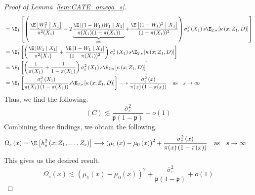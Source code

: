 \begin{proof}[Proof of Lemma~\ref{lem:CATE_omega_s}]
\begin{equation}
\begin{aligned}
            & = \E_{1}\left[\left(\frac{\E\left[W_{1}^2 \; \middle| \; X_1\right]}{\pi^2(X_1)} 
            - 2 \underbrace{\frac{\E\left[(1 - W_{1})W_{1}\; \middle| \; X_1\right]}{\pi(X_1)(1 - \pi(X_1))}}_{ = 0} 
            + \frac{\E\left[(1 - W_{1})^2\; \middle| \; X_1\right]}{(1 - \pi(X_1))^2}\right)
             \sigma_{\varepsilon}^2\left(X_1\right) s \E_{2:s}\left[\kappa\left(x; Z_1, D\right)\right]\right] \\ 
            & = \E_{1}\left[\left(\frac{\E\left[W_{1} \; \middle| \; X_1\right]}{\pi^2(X_1)} 
            + \frac{\E\left[1 - W_{1}\; \middle| \; X_1\right]}{(1 - \pi(X_1))^2}\right)
             \sigma_{\varepsilon}^2\left(X_1\right) s \E_{2:s}\left[\kappa\left(x; Z_1, D\right)\right]\right] \\
            & = \E_{1}\left[\left(\frac{1}{\pi(X_1)} + \frac{1}{1 - \pi(X_1)}\right)
             \sigma_{\varepsilon}^2\left(X_1\right) s \E_{2:s}\left[\kappa\left(x; Z_1, D\right)\right]\right] \\
            & = \E_{1}\left[\frac{\sigma_{\varepsilon}^2\left(X_1\right)}{\pi(X_1)\left(1 - \pi(X_1)\right)} s \E_{2:s}\left[\kappa\left(x; Z_1, D\right)\right]\right]
            \longrightarrow \frac{\sigma_{\varepsilon}^2\left(x\right)}{\pi(x)\left(1 - \pi(x)\right)}
            \quad \text{as} \quad
            s \rightarrow \infty
        \end{aligned}
    \end{equation}
    Thus, we find the following.
    \begin{equation}
        (C) \lesssim \frac{\overline{\sigma}^2_{\varepsilon}}{\mathfrak{p}\left(1 - \mathfrak{p}\right)} + o(1)
    \end{equation}
    Combining these findings, we obtain the following.
    \begin{equation}
        \begin{aligned}
            \Omega_{s}\left(x\right)
            & = \E\left[h_{s}^{2}\left(x; Z_1, \ldots,  Z_{s}\right)\right]
            \longrightarrow \left(\mu_{1}\left(x\right) - \mu_{0}\left(x\right)\right)^2 + \frac{\sigma_{\varepsilon}^2\left(x\right)}{\pi(x)\left(1 - \pi(x)\right)}
            \quad \text{as} \quad
            s \rightarrow \infty
        \end{aligned}
    \end{equation}
    This gives us the desired result.
    \begin{equation}
        \Omega_{s}\left(x\right)
        \lesssim \left(\mu_{1}\left(x\right) - \mu_{0}\left(x\right)\right)^2 + \frac{\overline{\sigma}^2_{\varepsilon}}{\mathfrak{p}\left(1 - \mathfrak{p}\right)} + o(1)
    \end{equation}
\end{proof}

